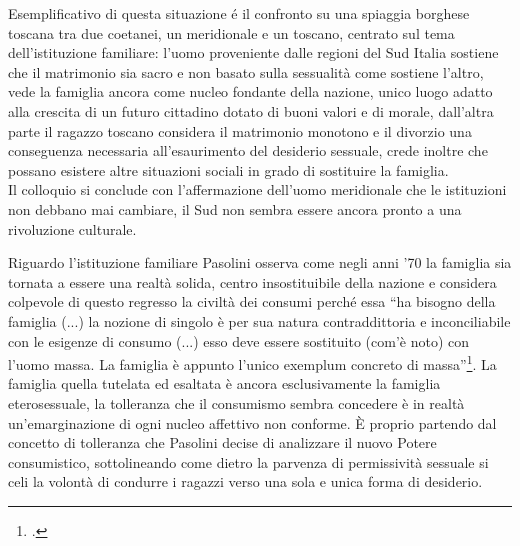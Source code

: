 Esemplificativo di questa situazione é il confronto su una spiaggia borghese toscana tra due coetanei, un meridionale e un toscano, centrato sul tema dell'istituzione familiare: l'uomo proveniente dalle regioni del Sud Italia sostiene che il matrimonio sia sacro e non basato sulla sessualità come sostiene l'altro, vede la famiglia ancora come nucleo fondante della nazione, unico luogo adatto alla crescita di un futuro cittadino dotato di buoni valori e di morale, dall'altra parte il ragazzo toscano considera il matrimonio monotono e il divorzio una conseguenza necessaria all'esaurimento del desiderio sessuale, crede inoltre che possano esistere altre situazioni sociali in grado di sostituire la famiglia.
\\Il colloquio si conclude con l'affermazione dell'uomo meridionale che le istituzioni non debbano mai cambiare, il Sud non sembra essere ancora pronto a una rivoluzione culturale. 

Riguardo l'istituzione familiare Pasolini osserva come negli anni '70 la famiglia sia tornata a essere una realtà solida, centro insostituibile della nazione e considera colpevole di questo regresso la civiltà dei consumi perché essa \enquote{ha bisogno della famiglia (...) la nozione di singolo è per sua natura contraddittoria e inconciliabile con le esigenze di consumo (...) esso deve essere sostituito (com'è noto) con l'uomo massa. La famiglia è appunto l'unico exemplum concreto di massa}\footcite{Scritti2}.
La famiglia quella tutelata ed esaltata è ancora esclusivamente la famiglia eterosessuale, la tolleranza che il consumismo sembra concedere è in realtà un'emarginazione di ogni nucleo affettivo non conforme.
È proprio partendo dal concetto di tolleranza che Pasolini decise di analizzare il nuovo Potere consumistico, sottolineando come dietro la parvenza di permissività sessuale si celi la volontà di condurre i ragazzi verso una sola e unica forma di desiderio.

